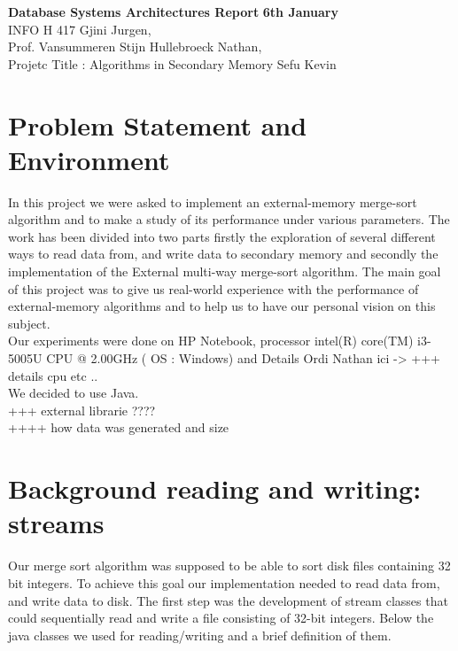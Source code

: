 \documentclass[14pt]{report}
\begin{document}
\noindent
\large\textbf{Database Systems Architectures Report} \hfill \textbf{6th January} \\
\normalsize INFO H 417 \hfill Gjini Jurgen,  \\
Prof. Vansummeren Stijn \hfill Hullebroeck Nathan, \\
Projetc Title : Algorithms in Secondary Memory \hfill Sefu Kevin

\section*{Problem Statement and Environment}
In this project we were asked to implement an external-memory merge-sort algorithm and to make a study of its performance under various parameters. The work has been divided into two parts firstly the exploration of several different ways to read data from, and write data to secondary memory and secondly the implementation of the External multi-way merge-sort algorithm. The main goal of this project was to give us real-world experience with the performance of external-memory algorithms and to help us to have our personal vision on this subject.\\
Our experiments were done on HP Notebook,  processor intel(R) core(TM) i3-5005U CPU @ 2.00GHz ( OS : Windows) and Details Ordi Nathan ici ->  +++ details cpu etc ..\\
We decided to use Java.\\
+++ external librarie ????\\
++++ how data was generated and size 



\section*{Background reading and writing: streams}
Our merge sort algorithm was supposed to be able to sort disk files containing 32 bit integers. To achieve this goal our implementation needed to read data from, and write data to disk. The first step was the development of stream classes that could sequentially read and write a ﬁle consisting of 32-bit integers. Below the java classes we used for reading/writing and a brief definition of them.
\end{document}
